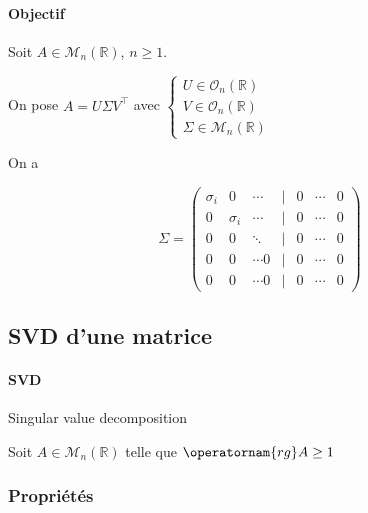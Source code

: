 \documentclass{article}
\newcommand{\cM}{\mathcal{M}}
\newcommand{\cO}{\mathcal{O}}
\newcommand{\R}{\mathbb{R}}
\begin{document}
\paragraph{Objectif}
Soit $A \in \cM_{n}(\R)$, $n \ge 1$.

On pose $
	A = U \Sigma V^\top
$  avec $\begin{cases}
U \in \cO_n(\R) \\
V \in \cO_n(\R) \\
\Sigma \in \cM_n(\R)
\end{cases}$

On a 

\[
	\Sigma = \begin{pmatrix} \sigma_i & 0 & \cdots & | & 0 & \cdots & 0 \\ 0 & \sigma_i & \cdots & | & 0 & \cdots & 0 \\ 0 & 0 & \ddots & | & 0 & \cdots  & 0 \\ \hline 0  & 0  & \cdots 0 & | & 0 & \cdots & 0 \\ 0  & 0 & \cdots 0 & | & 0 & \cdots & 0\end{pmatrix} 
\] 


\subsection{SVD d'une matrice}

\paragraph{SVD} Singular value decomposition

Soit $A \in \cM_n(\R)$ telle que $\operatornam{rg}A \ge  1$


\subsubsection{Propriétés}
\end{document}
